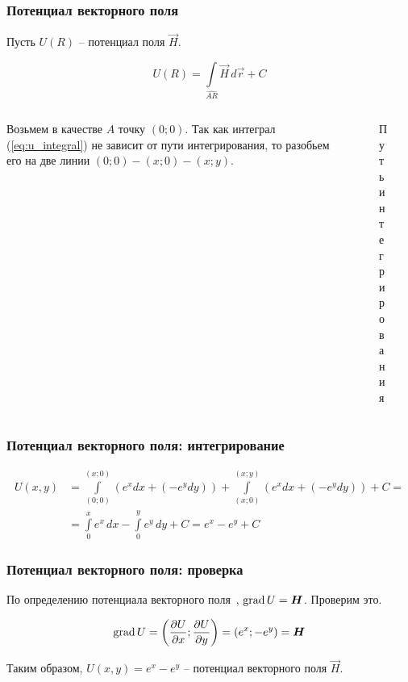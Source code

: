 \begin{frame}\frametitle{Потенциал векторного поля}
	Пусть \(U(R)\) -- потенциал поля \(\vec H\).

	\begin{equation}
		U(R) =
		\int\limits_{\widehat{AR}} \vec H \, d \vec r + C
		\label{eq:u_integral}
	\end{equation}


	\begin{columns}
		\begin{column}{0.5\textwidth}
			Возьмем в качестве $A$ точку $(0; 0)$.
			Так как интеграл (\ref{eq:u_integral}) не зависит от пути интегрирования,
			то разобьем его на две линии $(0; 0) - (x; 0) - (x; y)$.
		\end{column}
		\begin{column}{0.5\textwidth}
			\begin{figure}
				\centering
				\caption{Путь интегрирования}
			\end{figure}
		\end{column}
	\end{columns}

\end{frame}

\begin{frame}\frametitle{Потенциал векторного поля: интегрирование}
	\begin{align*}
		U(x, y) & = \int\limits_{(0; 0)}^{(x; 0)} \left(e^x dx + (-e^y dy) \right) +
		\int\limits_{(x; 0)}^{(x; y)} \left(e^x dx + (-e^y dy) \right) + C =         \\
		        & =
		\int\limits_{0}^{x} e^x \, dx - \int\limits_{0}^{y} e^y \, dy + C =
		e^{x} - e^{y} + C
	\end{align*}
\end{frame}

\begin{frame}\frametitle{Потенциал векторного поля: проверка}
	По определению потенциала векторного поля~\cite[ст.~269]{zorich}, $\grad U = \vec H$. Проверим это.

	\begin{equation*}
		\grad U =
		\left( \frac{\partial U}{\partial x}; \frac{\partial U}{\partial y} \right) =
		\left( e^x; -e^y \right)
		= \vec H
	\end{equation*}

	Таким образом, \(U(x,y) = e^{x} - e^{y}\) -- потенциал векторного поля \(\vec H\).
\end{frame}
